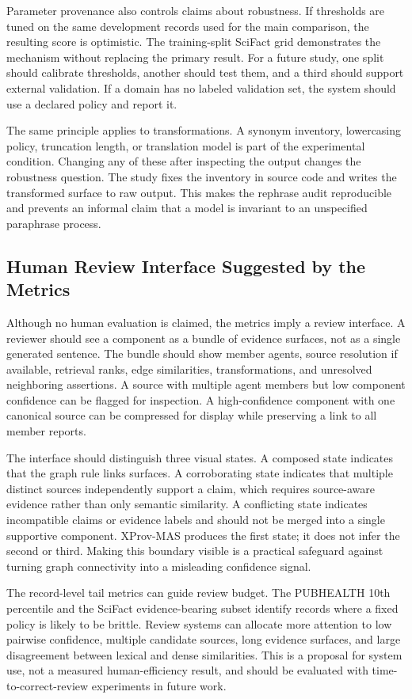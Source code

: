 \documentclass{ieeeaccess}
\begin{document}
Parameter provenance also controls claims about robustness. If thresholds are tuned on the same development records used for the main comparison, the resulting score is optimistic. The training-split SciFact grid demonstrates the mechanism without replacing the primary result. For a future study, one split should calibrate thresholds, another should test them, and a third should support external validation. If a domain has no labeled validation set, the system should use a declared policy and report it.

The same principle applies to transformations. A synonym inventory, lowercasing policy, truncation length, or translation model is part of the experimental condition. Changing any of these after inspecting the output changes the robustness question. The study fixes the inventory in source code and writes the transformed surface to raw output. This makes the rephrase audit reproducible and prevents an informal claim that a model is invariant to an unspecified paraphrase process.

\subsection{Human Review Interface Suggested by the Metrics}
Although no human evaluation is claimed, the metrics imply a review interface. A reviewer should see a component as a bundle of evidence surfaces, not as a single generated sentence. The bundle should show member agents, source resolution if available, retrieval ranks, edge similarities, transformations, and unresolved neighboring assertions. A source with multiple agent members but low component confidence can be flagged for inspection. A high-confidence component with one canonical source can be compressed for display while preserving a link to all member reports.

The interface should distinguish three visual states. A composed state indicates that the graph rule links surfaces. A corroborating state indicates that multiple distinct sources independently support a claim, which requires source-aware evidence rather than only semantic similarity. A conflicting state indicates incompatible claims or evidence labels and should not be merged into a single supportive component. XProv-MAS produces the first state; it does not infer the second or third. Making this boundary visible is a practical safeguard against turning graph connectivity into a misleading confidence signal.

The record-level tail metrics can guide review budget. The PUBHEALTH 10th percentile and the SciFact evidence-bearing subset identify records where a fixed policy is likely to be brittle. Review systems can allocate more attention to low pairwise confidence, multiple candidate sources, long evidence surfaces, and large disagreement between lexical and dense similarities. This is a proposal for system use, not a measured human-efficiency result, and should be evaluated with time-to-correct-review experiments in future work.
\end{document}
